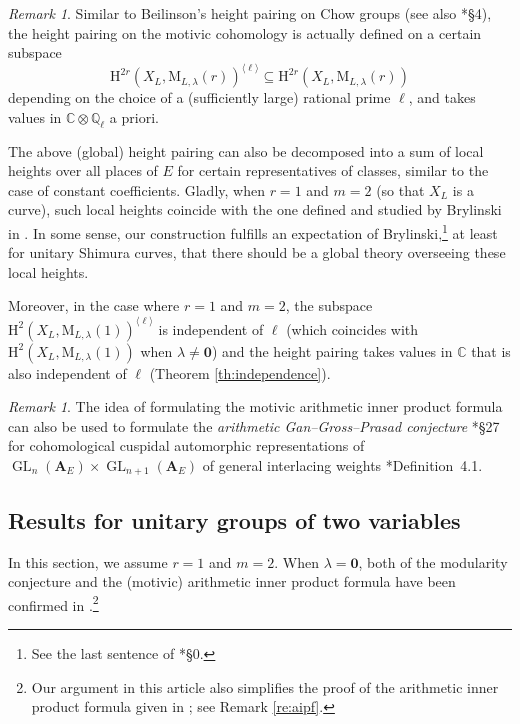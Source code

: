 \documentclass[12pt]{amsart}
\numberwithin{equation}{section}
\theoremstyle{plain}
\theoremstyle{definition}
\theoremstyle{remark}
\newtheorem{remark}[proposition]{Remark}
\renewcommand{\b}[1]{\mathbf{#1}}
\renewcommand{\d}[1]{\mathbb{#1}}
\renewcommand{\r}[1]{\mathrm{#1}}
\renewcommand{\(}{\left(}
\renewcommand{\)}{\right)}
\newcommand{\ang}[1]{\langle{#1}\rangle}
\newcommand{\bA}{\b A}
\newcommand{\dC}{\d C}
\newcommand{\dQ}{\d Q}
\newcommand{\rH}{\r H}
\newcommand{\rM}{\r M}
\DeclareMathOperator{\GL}{GL}
\begin{document}
\begin{remark}\label{re:height_intro}
Similar to Beilinson's height pairing on Chow groups \cite{Bei87} (see also \cite{LL21}*{\S4}), the height pairing on the motivic cohomology is actually defined on a certain subspace
\[
\rH^{2r}(X_L,\rM_{L,\lambda}(r))^{\ang{\ell}}\subseteq\rH^{2r}(X_L,\rM_{L,\lambda}(r))
\]
depending on the choice of a (sufficiently large) rational prime $\ell$, and takes values in $\dC\otimes\dQ_\ell$ a priori.

The above (global) height pairing can also be decomposed into a sum of local heights over all places of $E$ for certain representatives of classes, similar to the case of constant coefficients. Gladly, when $r=1$ and $m=2$ (so that $X_L$ is a curve), such local heights coincide with the one defined and studied by Brylinski in \cite{Bry89}. In some sense, our construction fulfills an expectation of Brylinski,\footnote{See the last sentence of \cite{Bry89}*{\S0}.} at least for unitary Shimura curves, that there should be a global theory overseeing these local heights.

Moreover, in the case where $r=1$ and $m=2$, the subspace $\rH^2(X_L,\rM_{L,\lambda}(1))^{\ang{\ell}}$ is independent of $\ell$ (which coincides with $\rH^2(X_L,\rM_{L,\lambda}(1))$ when $\lambda\neq\b{0}$) and the height pairing takes values in $\dC$ that is also independent of $\ell$ (Theorem \ref{th:independence}).
\end{remark}



\begin{remark}
The idea of formulating the motivic arithmetic inner product formula can also be used to formulate the \emph{arithmetic Gan--Gross--Prasad conjecture} \cite{GGP12}*{\S27} for cohomological cuspidal automorphic representations of $\GL_n(\bA_E)\times\GL_{n+1}(\bA_E)$ of general interlacing weights \cite{Liu25}*{Definition~4.1}.
\end{remark}



\subsection{Results for unitary groups of two variables}


In this section, we assume $r=1$ and $m=2$. When $\lambda=\b{0}$, both of the modularity conjecture and the (motivic) arithmetic inner product formula have been confirmed in \cites{Liu11,Liu12}.\footnote{Our argument in this article also simplifies the proof of the arithmetic inner product formula given in \cite{Liu12}; see Remark \ref{re:aipf}.}
\end{document}
